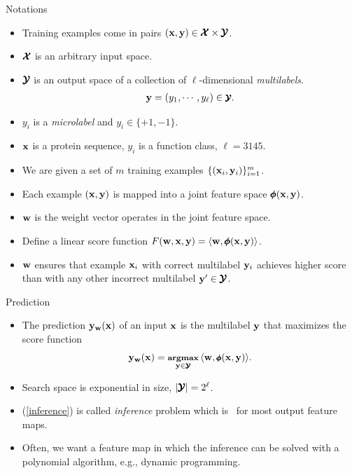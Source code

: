 \documentclass[first=dgreen,second=purple,logo=yellowexc]{aaltoslides}
\begin{document}
\begin{frame}{Notations}
	\begin{itemize}\footnotesize
		\item Training examples come in pairs $(\mathbf {x},\mathbf {y})\in\pmb {\mathcal{X}}\times\pmb {\mathcal{Y}}$.
		\item $\pmb {\mathcal{X}}$ is an arbitrary input space.
		\item $\pmb {\mathcal{Y}}$ is an output space of a collection of $\ell$-dimensional {\em multilabels}.
		\begin{align*}\footnotesize
			\mathbf {y}=(y_1,\cdots,y_{\ell})\in\pmb {\mathcal{Y}}.
		\end{align*}
		\item $y_i$ is a {\em microlabel} and $y_i\in\{+1,-1\}$.
		\item $\mathbf {x}$ is a protein sequence, $y_i$ is a function class, $\ell=3145$.
		\item We are given a set of $m$ training examples $\{(\mathbf {x}_i,\mathbf {y}_i)\}_{i=1}^m$.
		\item Each example $(\mathbf {x},\mathbf {y})$ is mapped into a joint feature space $\pmb \phi(\mathbf {x},\mathbf {y})$.
		\item $\mathbf {w}$ is the weight vector operates in the joint feature space.
		\item Define a linear score function $F(\mathbf {w},\mathbf {x},\mathbf {y}) = \langle \mathbf {w}, \pmb \phi(\mathbf {x},\mathbf {y}) \rangle$.
		\item $\mathbf {w}$ ensures that example $\mathbf {x}_i$ with correct multilabel $\mathbf {y}_i$ achieves higher score than with any other incorrect multilabel $\mathbf {y}'\in\pmb {\mathcal{Y}}$.
	\end{itemize}
\end{frame}

\begin{frame}{Prediction}
	\begin{itemize}
		\item The prediction $\mathbf {y}_{\mathbf {w}}(\mathbf {x})$ of an input $\mathbf {x}$ is the multilabel $\mathbf {y}$ that maximizes the score function 
		\begin{align}\footnotesize
			\mathbf {y}_{\mathbf {w}}(\mathbf {x}) = \underset{\mathbf {y}\in\pmb {\mathcal{Y}}}{\textbf{argmax}}\,\langle \mathbf {w}, \pmb \phi(\mathbf {x},\mathbf {y}) \rangle. \label{inference}
		\end{align}
		\item Search space is exponential in size, $|\pmb {\mathcal{Y}}|=2^{\ell}$.
		\item (\ref{inference}) is called {\em inference} problem which is \nphard\ for most output feature maps.
		\item Often, we want a feature map in which the inference can be solved with a polynomial algorithm, e.g., dynamic programming.
	\end{itemize}
\end{frame}
\end{document}
